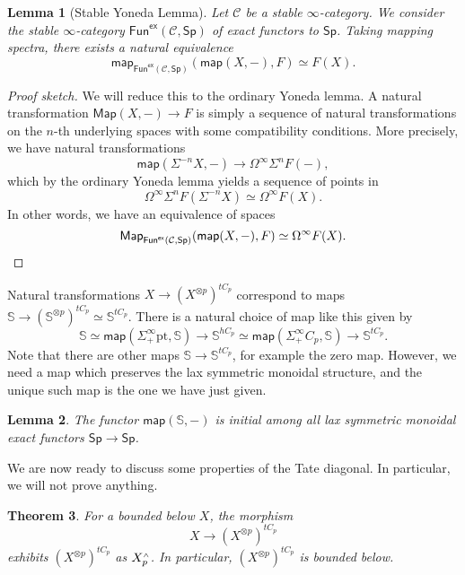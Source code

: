 \documentclass[10pt, oneside]{memoir}
\newtheorem{thm}{Theorem}[subsection]
\newtheorem{lem}[thm]{Lemma}
\theoremstyle{definition}
\theoremstyle{remark}
\theoremstyle{plain}
\theoremstyle{definition}
\theoremstyle{remark}
\newcommand{\bS}{\mathbb{S}}
\newcommand{\mc}[1]{\mathcal{#1}}
\newcommand{\mr}[1]{\mathrm{#1}}
\newcommand{\ms}[1]{\mathsf{#1}}
\newcommand{\1}{\mathbf{1}}
\newcommand{\2}{\mathbf{2}}
\newcommand{\3}{\mathbf{3}}
\newcommand{\pt}{\mr{pt}}
\newcommand{\sw}{\mathsmaller{\wedge}}
\begin{document}
\begin{lem}[Stable Yoneda Lemma]
    Let $\mc{C}$ be a stable $\infty$-category. We consider the stable $\infty$-category $\ms{Fun}^{\ms{ex}}(\mc{C}, \ms{Sp})$ of exact functors to $\ms{Sp}$. Taking mapping spectra, there exists a natural equivalence
    \[ \ms{map}_{\ms{Fun}^{\ms{ex}}(\mc{C}, \ms{Sp})} (\ms{map}(X, -), F) \simeq F(X). \]
\end{lem}

\begin{proof}[Proof sketch]
    We will reduce this to the ordinary Yoneda lemma. A natural transformation $\ms{Map}(X, -) \to F$ is simply a sequence of natural transformations on the $n$-th underlying spaces with some compatibility conditions. More precisely, we have natural transformations
    \[ \ms{map}(\Sigma^{-n} X, -) \to \Omega^{\infty} \Sigma^n F(-), \]
    which by the ordinary Yoneda lemma yields a sequence of points in 
    \[ \Omega^{\infty} \Sigma^n F(\Sigma^{-n} X)  \simeq \Omega^{\infty} F(X). \]
    In other words, we have an equivalence of spaces
    \[ \ms{Map}_{\ms{Fun}^{\ms{ex}}(\mc{C}, \ms{Sp})} (\ms{map}(X, -), F) \simeq \Omega^{\infty} F(X). \qedhere \]
\end{proof}

Natural transformations $X \to (X^{\otimes p})^{t C_p}$ correspond to maps $\bS \to (\bS^{\otimes p})^{t C_p} \simeq \bS^{t C_p}$. There is a natural choice of map like this given by
\[ \bS \simeq \ms{map}(\Sigma_+^{\infty} \pt, \bS) \to \bS^{h C_p} \simeq \ms{map}(\Sigma_+^{\infty} C_p, \bS) \to \bS^{t C_p}. \]
Note that there are other maps $\bS \to \bS^{t C_p}$, for example the zero map. However, we need a map which preserves the lax symmetric monoidal structure, and the unique such map is the one we have just given.

\begin{lem}
    The functor $\ms{map}(\bS, -)$ is initial among all lax symmetric monoidal exact functors $\ms{Sp} \to \ms{Sp}$.
\end{lem}

We are now ready to discuss some properties of the Tate diagonal. In particular, we will not prove anything.

\begin{thm}
    For a bounded below $X$, the morphism
    \[ X \to (X^{\otimes p})^{t C_p} \]
    exhibits $(X^{\otimes p})^{t C_p}$ as $X_p^{\sw}$. In particular, $(X^{\otimes p})^{t C_p}$ is bounded below.
\end{thm}
\end{document}
